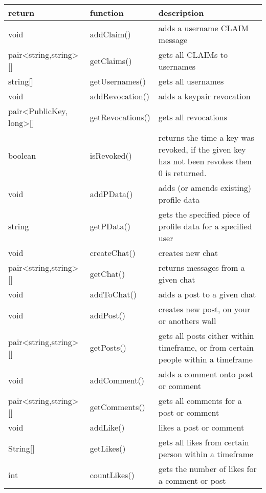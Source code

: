 \begin{table}[h]
    \centering
    \begin{tabular}{p{3cm}p{3cm}p{9cm}}
    return                & function                             & description\\ \hline
    
    void                  & addClaim()     & adds a username CLAIM message\\
    pair<string,string>[] & getClaims()    & gets all CLAIMs to usernames\\
    string[]              & getUsernames() & gets all usernames\\
    
    void                    & addRevocation()  & adds a keypair revocation\\
    pair<PublicKey, long>[] & getRevocations() & gets all revocations\\
    boolean                 & isRevoked()      & returns the time a key was revoked, if the given key has not been revokes then 0 is returned.\\
    
    void   & addPData() & adds (or amends existing) profile data\\
    string & getPData() & gets the specified piece of profile data for a specified user\\
    
    void                  & createChat() & creates new chat\\
    pair<string,string>[] & getChat()    & returns messages from a given chat\\
    void                  & addToChat()  & adds a post to a given chat\\
    
    void                  & addPost()  & creates new post, on your or anothers wall\\
    pair<string,string>[] & getPosts() & gets all posts either within timeframe, or from certain people within a timeframe\\
    
    void                  &  addComment() & adds a comment onto post or comment\\
    pair<string,string>[] & getComments() & gets all comments for a post or comment\\
    
    void     & addLike() & likes a post or comment\\
    String[] & getLikes() & gets all likes from certain person within a timeframe\\
    int      & countLikes() & gets the number of likes for a comment or post\\
    

\end{tabular}
\end{table}
